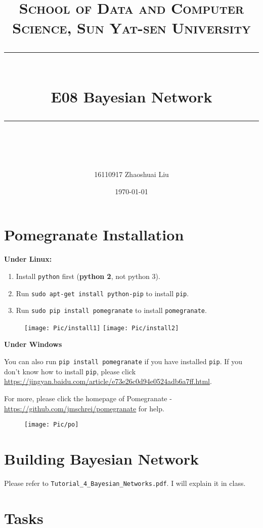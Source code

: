 ﻿\documentclass[a4paper, 11pt]{article}
\title{	
\normalfont \normalsize
\textsc{School of Data and Computer Science, Sun Yat-sen University} \\ [25pt] %
\rule{\textwidth}{0.5pt} \\[0.4cm] %
\huge  E08 Bayesian Network \\ %
\rule{\textwidth}{2pt} \\[0.5cm] %
\author{16110917 Zhaoshuai Liu}
\date{\normalsize\today}
}
\begin{document}
\maketitle
\tableofcontents
\newpage
\section{Pomegranate Installation}
\textbf{Under Linux:}
\begin{enumerate}
\item Install \texttt{python} first (\textbf{python 2}, not python 3).
\item Run \texttt{sudo apt-get install python-pip} to install \texttt{pip}.
\item Run \texttt{sudo pip install pomegranate} to install \texttt{pomegranate}.
\end{enumerate}
\begin{figure}[h]
  \centering
  \texttt{[image: Pic/install1]}
  \qquad
  \texttt{[image: Pic/install2]}
\end{figure}
\textbf{Under Windows}

You can also run \texttt{pip install pomegranate} if you have installed \texttt{pip}. If you don't know how to install \texttt{pip}, please click \url{https://jingyan.baidu.com/article/e73e26c0d94e0524adb6a7ff.html}.

For more, please click the homepage of Pomegranate - \url{https://github.com/jmschrei/pomegranate} for help. 
\begin{figure}[h]

  
  \centering
\texttt{[image: Pic/po]}
  
\end{figure}

\section{Building Bayesian Network}
\label{sec:build-bayes-netw}
Please refer to \texttt{Tutorial\_4\_Bayesian\_Networks.pdf}. I will explain it in class.

\section{Tasks}
\label{sec:tasks}
\end{document}
